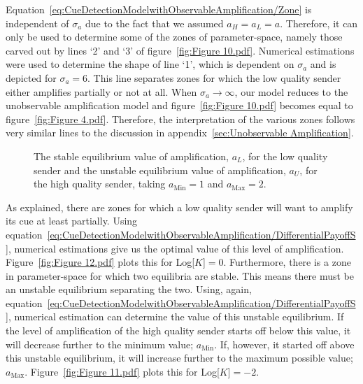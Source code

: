 \documentclass[a4paper,12pt]{article}
\numberwithin{equation}{section}
\numberwithin{figure}{section}
\begin{document}
Equation~\ref{eq:CueDetectionModelwithObservableAmplification/Zone} is independent of $\sigma_{a}$ due to the fact that we assumed $a_{H}=a_{L}=a$. Therefore, it can only be used to determine some of the zones of parameter-space, namely those carved out by lines `2' and `3' of figure~\ref{fig:Figure 10.pdf}. Numerical estimations were used to determine the shape of line `1', which is dependent on $\sigma_{a}$ and is depicted for $\sigma_{a}=6$. This line separates zones for which the low quality sender either amplifies partially or not at all. When $\sigma_{a} \to \infty$, our model reduces to the unobservable amplification model and figure~\ref{fig:Figure 10.pdf} becomes equal to figure~\ref{fig:Figure 4.pdf}. Therefore, the interpretation of the various zones follows very similar lines to the discussion in appendix~\ref{sec:Unobservable Amplification}.

\begin{figure}[h]
\captionsetup{width=380pt}
\begin{center}
\hspace{10mm}
\caption[]{The stable equilibrium value of amplification, $a_{L}$, for the low quality sender and the unstable equilibrium value of amplification, $a_{U}$, for the high quality sender, taking $a_{\text{Min}}=1$ and $a_{\text{Max}}=2$.}
\label{fig:Figure 1112}
\end{center}
\end{figure}

As explained, there are zones for which a low quality sender will want to amplify its cue at least partially. Using equation~\ref{eq:CueDetectionModelwithObservableAmplification/DifferentialPayoffS}, numerical estimations give us the optimal value of this level of amplification. Figure~\ref{fig:Figure 12.pdf} plots this for Log[$K$]$=0$. Furthermore, there is a zone in parameter-space for which two equilibria are stable. This means there must be an unstable equilibrium separating the two. Using, again, equation~\ref{eq:CueDetectionModelwithObservableAmplification/DifferentialPayoffS}, numerical estimation can determine the value of this unstable equilibrium. If the level of amplification of the high quality sender starts off below this value, it will decrease further to the minimum value; $a_{\text{Min}}$. If, however, it started off above this unstable equilibrium, it will increase further to the maximum possible value; $a_{\text{Max}}$. Figure~\ref{fig:Figure 11.pdf} plots this for Log[$K$]$=-2$.
\end{document}
